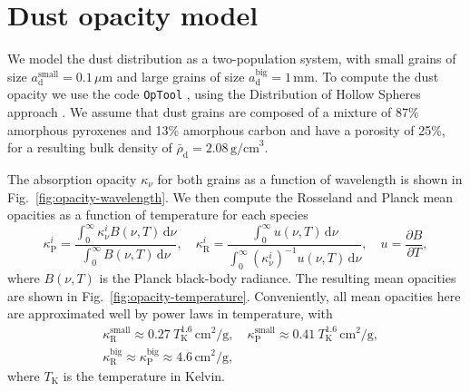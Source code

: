 \documentclass[fleqn,usenatbib,useAMS]{mnras}
\newcommand{\DP}[2]{\frac{\partial{#1}}{\partial{#2}}}
\newcommand{\kappaR}{\kappa_\mathrm{R}}
\newcommand{\kappaP}{\kappa_\mathrm{P}}
\newcommand{\ad}{a_\mathrm{d}}
\newcommand{\brhod}{\bar{\rho}_\mathrm{d}}
\begin{document}
\section{Dust opacity model}
\label{sec:dust-opacity}

We model the dust distribution as a two-population system, with small grains of size $\ad^\text{small}=0.1\,\mu$m and large grains of size $\ad^\text{big}=1\,\text{mm}$. To compute the dust opacity we use the code \texttt{OpTool} \citep{dominik-etal-2021}, using the Distribution of Hollow Spheres approach \citep[DHS,][]{min-etal-2005}. We assume that dust grains are composed of a mixture of 87\% amorphous pyroxenes and 13\% amorphous carbon \citep{zubko-etal-1996} and have a porosity of 25\%, for a resulting bulk density of $\brhod=2.08\,\text{g/cm}^3$.

The absorption opacity $\kappa_\nu$ for both grains as a function of wavelength is shown in Fig.~\ref{fig:opacity-wavelength}. We then compute the Rosseland and Planck mean opacities as a function of temperature for each species
%
\begin{equation}
	\label{eq:opacity-mean}
	\kappa_\text{P}^i = \frac{\int_0^\infty \kappa_\nu^i B(\nu,T)\,\text{d}\nu}{\int_0^\infty B(\nu,T)\,\text{d}\nu},\quad \kappa_\text{R}^i = \frac{\int_0^\infty u(\nu,T)\,\text{d}\nu}{\int_0^\infty (\kappa_\nu^i)^{-1} u(\nu,T)\,\text{d}\nu}, \quad u = \DP{B}{T},
\end{equation}
%
where $B(\nu,T)$ is the Planck black-body radiance. The resulting mean opacities are shown in Fig.~\ref{fig:opacity-temperature}. Conveniently, all mean opacities here are approximated well by power laws in temperature, with
%
\begin{align}
\label{eq:opacity-power-law}
&\kappaR^\text{small} \approx 0.27~T_\text{K}^{1.6}\,\text{cm}^2/\text{g},\quad \kappaP^\text{small} \approx 0.41~T_\text{K}^{1.6}\,\text{cm}^2/\text{g},\\
&\kappaR^\text{big} \approx \kappaP^\text{big}\approx 4.6\,\text{cm}^2/\text{g},
\end{align}
%
where $T_\text{K}$ is the temperature in Kelvin. 
%
\end{document}
